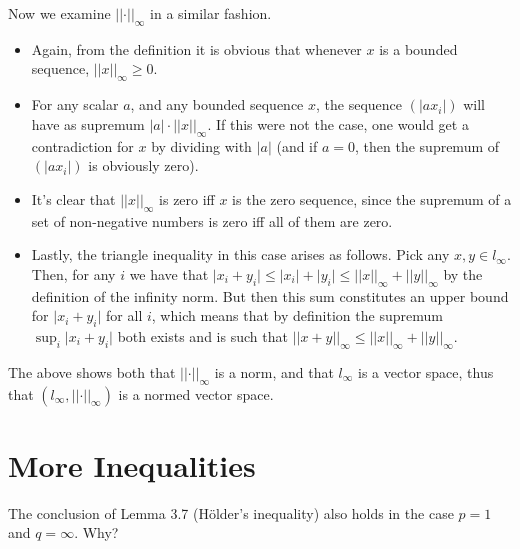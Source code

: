 \begin{solution}
    Now we examine $\lvert \lvert \cdot \rvert \rvert _{\infty}$ in a similar fashion.
    \begin{itemize}
        \item Again, from the definition it is obvious that whenever $x$ is a bounded sequence, $\lvert \lvert x \rvert \rvert _{\infty} \geq 0$.
        \item For any scalar $a$, and any bounded sequence $x$, the sequence $(\lvert a x_i \rvert)$ will have as supremum $\lvert a \rvert \cdot \lvert \lvert x \rvert \rvert _{\infty}$. 
        If this were not the case, one would get a contradiction for $x$ by dividing with $\lvert a \rvert$ (and if $a = 0$, then the supremum of $(\lvert a x_i \rvert)$ is obviously zero).
        \item It's clear that $\lvert \lvert x \rvert \rvert _{\infty}$ is zero iff $x$ is the zero sequence, since the supremum of a set of non-negative numbers is zero iff all of them are zero.
        \item Lastly, the triangle inequality in this case arises as follows.
        Pick any $x, y \in l_{\infty}$.
        Then, for any $i$ we have that $\lvert x_i + y_i \rvert \leq \lvert x_i \rvert + \lvert y_i \rvert \leq \lvert \lvert x \rvert \rvert _{\infty} + \lvert \lvert y \rvert \rvert _{\infty}$ by the definition of the infinity norm.
        But then this sum constitutes an upper bound for $\lvert x_i + y_i \rvert$ for all $i$, which means that by definition the supremum $\sup_{i} \lvert x_i + y_i \rvert$ both exists and is such that $\lvert \lvert x + y \rvert \rvert _{\infty} \leq \lvert \lvert x \rvert \rvert _{\infty} + \lvert \lvert y \rvert \rvert _{\infty}$.
    \end{itemize}
    The above shows both that $\lvert \lvert \cdot \rvert \rvert _{\infty}$ is a norm, and that $l_{\infty}$ is a vector space, thus that $(l_{\infty}, \lvert \lvert \cdot \rvert \rvert _{\infty})$ is a normed vector space.
\end{solution}

\section{More Inequalities}

\begin{exercise}{24}
    The conclusion of Lemma 3.7 (Hölder's inequality) also holds in the case $p = 1$ and $q = \infty$.
    Why?
\end{exercise}

